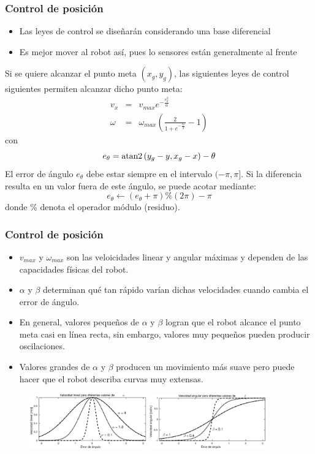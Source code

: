 \begin{frame}\frametitle{Control de posición}
  \begin{itemize}
  \item Las leyes de control se diseñarán considerando una base diferencial
  \item Es mejor mover al robot así, pues lo sensores están generalmente al frente
  \end{itemize}
  Si se quiere alcanzar el punto meta $(x_g, y_g)$, las siguientes leyes de control siguientes permiten alcanzar dicho punto meta:
  \begin{eqnarray*}
  v_x    &=& v_{max}e^{-\frac{e_{\theta}^{2}}{\alpha}}\label{eq:Control11}\\
  \omega &=& \omega_{max}\left(\frac{2}{1+e^{-\frac{e_{\theta}}{\beta}}}-1\right)\label{eq:Control12}
  \end{eqnarray*}
  con
  \[e_{\theta} = \operatorname{atan2}\left(y_g - y, x_g - x\right) - \theta\]
  El error de ángulo $e_\theta$ debe estar siempre en el intervalo $(-\pi, \pi]$. Si la diferencia resulta en un valor fuera de este ángulo, se puede acotar mediante:
  \[e_\theta \leftarrow \left(e_\theta + \pi\right)\% (2\pi) - \pi\]
  donde \% denota el operador módulo (residuo). 
\end{frame}

\begin{frame}\frametitle{Control de posición}
  \begin{itemize}
  \item $v_{max}$ y $\omega_{max}$ son las veloicidades linear y angular máximas y dependen de las capacidades físicas del robot.
  \item $\alpha$ y $\beta$ determinan qué tan rápido varían dichas velocidades cuando cambia el error de ángulo.
  \item En general, valores pequeños de $\alpha$ y $\beta$ logran que el robot alcance el punto meta casi en línea recta, sin embargo, valores muy pequeños pueden producir oscilaciones.
  \item Valores grandes de $\alpha$ y $\beta$ producen un movimiento más suave pero puede hacer que el robot describa curvas muy extensas. 
  \end{itemize}
  \begin{figure}
    \centering
    \includegraphics[width=0.45\textwidth]{Figures/LinearSpeed.eps}
    \includegraphics[width=0.45\textwidth]{Figures/AngularSpeed.eps}
  \end{figure}
\end{frame}

